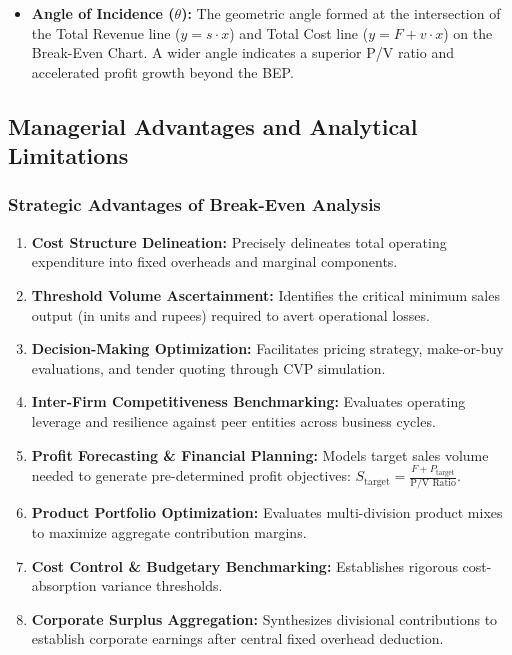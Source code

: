 \begin{formulabox}
\begin{itemize}[leftmargin=*, noitemsep]
    \item \textbf{Angle of Incidence ($\theta$):}
    The geometric angle formed at the intersection of the Total Revenue line ($y = s \cdot x$) and Total Cost line ($y = F + v \cdot x$) on the Break-Even Chart. A wider angle indicates a superior P/V ratio and accelerated profit growth beyond the BEP.
\end{itemize}
\end{formulabox}

\subsection{Managerial Advantages and Analytical Limitations}
\subsubsection{Strategic Advantages of Break-Even Analysis}
\begin{enumerate}[leftmargin=*, topsep=2pt, itemsep=2pt]
    \item \textbf{Cost Structure Delineation:} Precisely delineates total operating expenditure into fixed overheads and marginal components.
    \item \textbf{Threshold Volume Ascertainment:} Identifies the critical minimum sales output (in units and rupees) required to avert operational losses.
    \item \textbf{Decision-Making Optimization:} Facilitates pricing strategy, make-or-buy evaluations, and tender quoting through CVP simulation.
    \item \textbf{Inter-Firm Competitiveness Benchmarking:} Evaluates operating leverage and resilience against peer entities across business cycles.
    \item \textbf{Profit Forecasting \& Financial Planning:} Models target sales volume needed to generate pre-determined profit objectives: $S_{\text{target}} = \frac{F + P_{\text{target}}}{\text{P/V Ratio}}$.
    \item \textbf{Product Portfolio Optimization:} Evaluates multi-division product mixes to maximize aggregate contribution margins.
    \item \textbf{Cost Control \& Budgetary Benchmarking:} Establishes rigorous cost-absorption variance thresholds.
    \item \textbf{Corporate Surplus Aggregation:} Synthesizes divisional contributions to establish corporate earnings after central fixed overhead deduction.
\end{enumerate}

